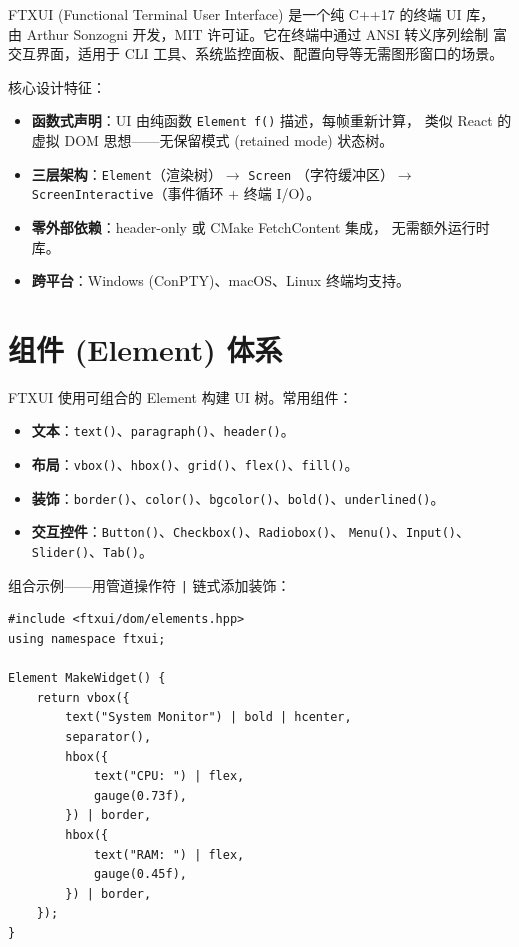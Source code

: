 \documentclass[12pt,a4paper,fontset=fandol]{ctexbook}
\newcommand{\cpplabel}{%
  \tcbox[on line,colback=cppheadbg,colframe=cppheadbg,
    boxrule=0pt,arc=1pt,left=2pt,right=2pt,top=1pt,bottom=1pt,
    colupper=white,fontupper=\scriptsize\bfseries]{C++}}
\newcommand{\Fn}[1]{\texttt{#1()}}
\newcommand{\Tp}[1]{\texttt{#1}}
\begin{document}
FTXUI (Functional Terminal User Interface) 是一个纯 C++17 的终端 UI 库，
由 Arthur Sonzogni 开发，MIT 许可证。它在终端中通过 ANSI 转义序列绘制
富交互界面，适用于 CLI 工具、系统监控面板、配置向导等无需图形窗口的场景。

核心设计特征：

\begin{itemize}
  \item \textbf{函数式声明}：UI 由纯函数 \Tp{Element f()} 描述，每帧重新计算，
        类似 React 的虚拟 DOM 思想——无保留模式 (retained mode) 状态树。
  \item \textbf{三层架构}：\Tp{Element}（渲染树）$\rightarrow$ \Tp{Screen}
        （字符缓冲区）$\rightarrow$ \Tp{ScreenInteractive}（事件循环 + 终端 I/O）。
  \item \textbf{零外部依赖}：header-only 或 CMake FetchContent 集成，
        无需额外运行时库。
  \item \textbf{跨平台}：Windows (ConPTY)、macOS、Linux 终端均支持。
\end{itemize}

\section{组件 (Element) 体系}

FTXUI 使用可组合的 Element 构建 UI 树。常用组件：

\begin{itemize}
  \item \textbf{文本}：\Fn{text}、\Fn{paragraph}、\Fn{header}。
  \item \textbf{布局}：\Fn{vbox}、\Fn{hbox}、\Fn{grid}、\Fn{flex}、\Fn{fill}。
  \item \textbf{装饰}：\Fn{border}、\Fn{color}、\Fn{bgcolor}、\Fn{bold}、\Fn{underlined}。
  \item \textbf{交互控件}：\Fn{Button}、\Fn{Checkbox}、\Fn{Radiobox}、
        \Fn{Menu}、\Fn{Input}、\Fn{Slider}、\Fn{Tab}。
\end{itemize}

组合示例——用管道操作符 \texttt{|} 链式添加装饰：

\cpplabel
\begin{lstlisting}[style=cppstyle]
#include <ftxui/dom/elements.hpp>
using namespace ftxui;

Element MakeWidget() {
    return vbox({
        text("System Monitor") | bold | hcenter,
        separator(),
        hbox({
            text("CPU: ") | flex,
            gauge(0.73f),
        }) | border,
        hbox({
            text("RAM: ") | flex,
            gauge(0.45f),
        }) | border,
    });
}
\end{lstlisting}
\end{document}
